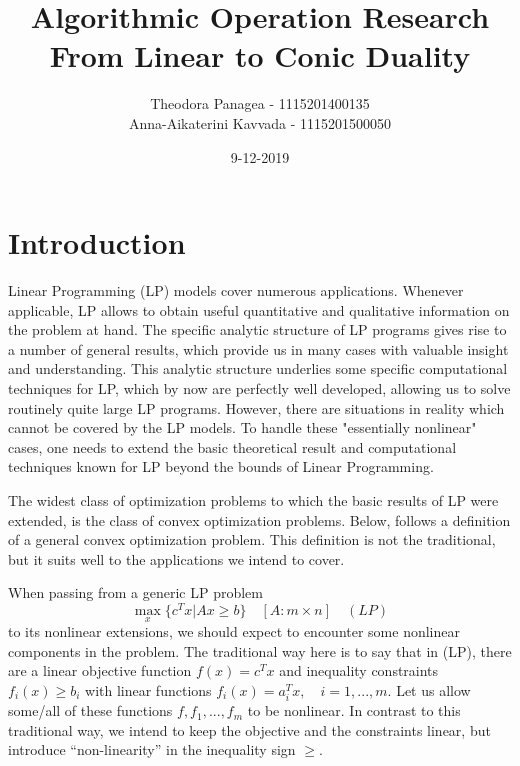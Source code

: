 \documentclass[12pt]{article}
\title{Algorithmic Operation Research \\ From Linear to Conic Duality}
\date{9-12-2019}
\author{Theodora Panagea - 1115201400135 \\ Anna-Aikaterini Kavvada - 1115201500050}
\begin{document}
	\maketitle{}
  	\tableofcontents
  	\section{Introduction}
  	
  	\par Linear Programming (LP) models cover numerous applications. Whenever applicable, LP allows to obtain useful quantitative and qualitative information on the problem at hand. The specific analytic structure of LP programs gives rise to a number of general results, which provide us in many cases with valuable insight and understanding. This analytic structure underlies some specific computational techniques for LP, which by now are perfectly well developed, allowing us to solve routinely quite large LP programs. However, there are situations in reality which cannot be covered by the LP models. To handle these "essentially nonlinear" cases, one needs to extend the basic theoretical result and computational techniques known for LP beyond the bounds of Linear Programming.\par
  	The widest class of optimization problems to which the basic results of LP were extended, is the class of convex optimization problems. Below, follows a definition of a general convex optimization problem. This definition is not the traditional, but it suits well to the applications we intend to cover.\par 
  	When passing from a generic LP problem 
  	$$\max\limits_{x} \{ c^T x | Ax \geq b \} \quad [A: m \times n] \quad (LP)$$
  	to its nonlinear extensions, we should expect to encounter some nonlinear components in the
    problem. The traditional way here is to say that in (LP), there are a linear objective function $f(x) = c^T x$ and inequality constraints $f_i (x) \geq b_i$ with linear functions $f_i (x) = a_i^T x,\quad i = 1, ..., m$. Let us allow some/all of these functions $f, f_1 , ..., f_ m$ to be nonlinear. In contrast to this traditional way, we intend to keep the objective and the constraints linear, but introduce “non-linearity” in the inequality sign $\geq$.
    
\end{document}
